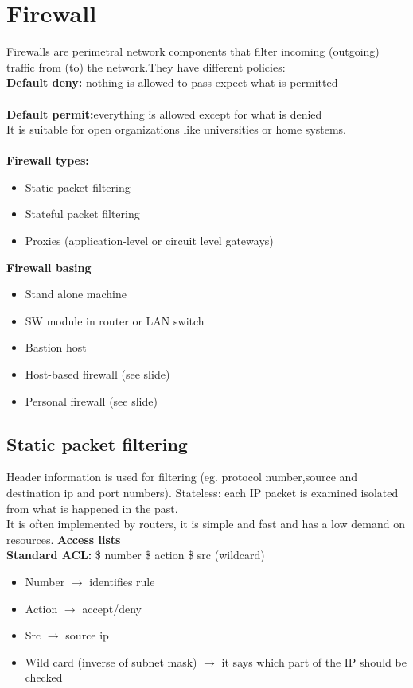 \documentclass[10pt,a4paper]{book}
\begin{document}
\chapter{Firewall}
Firewalls are perimetral network components that filter incoming (outgoing) traffic from (to) the network.They have different policies:\\
\textbf{Default deny:} nothing is allowed to pass expect what is permitted\\\\
\textbf{Default permit:}everything is allowed except for what is denied\\
It is suitable for open organizations like universities or home systems.\\\\
\textbf{Firewall types:}
\begin{itemize}
\item Static packet filtering
\item Stateful packet filtering
\item Proxies (application-level or circuit level gateways)
\end{itemize}
\textbf{Firewall basing}
\begin{itemize}
\item Stand alone machine
\item SW module in router or LAN switch
\item Bastion host
\item Host-based firewall (see slide)
\item Personal firewall (see slide)
\end{itemize}
\newpage
\section{Static packet filtering}
Header information is used for filtering (eg. protocol number,source and destination ip and port numbers). Stateless: each IP packet is examined isolated from what is happened in the past. \\
It is often implemented by routers, it is simple and fast and has a low demand on resources.
\textbf{Access lists}\\
\textbf{Standard ACL:} \$ number \$ action \$ src (wildcard)	
\begin{itemize}
\item Number $\to$ identifies rule
\item Action $\to$ accept/deny
\item Src $\to$ source ip
\item Wild card (inverse of subnet mask) $\to$ it says which part of the IP should be checked
\end{itemize}
\end{document}
